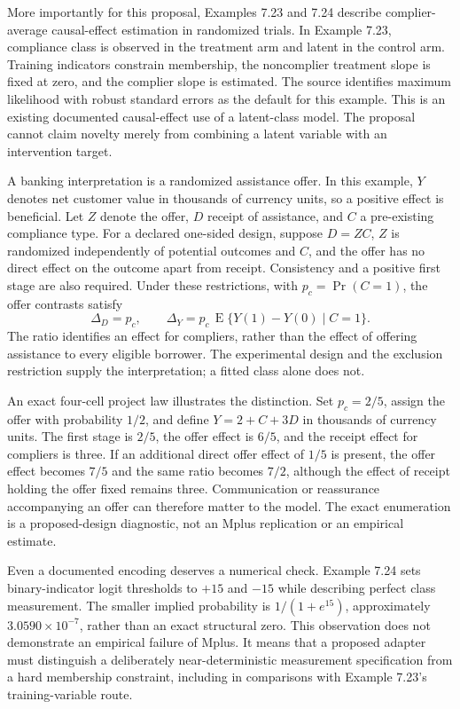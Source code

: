 More importantly for this proposal, Examples 7.23 and 7.24 describe
complier-average causal-effect estimation in randomized trials. In
Example 7.23, compliance class is observed in the treatment arm and
latent in the control arm. Training indicators constrain membership, the
noncomplier treatment slope is fixed at zero, and the complier slope is
estimated. The source identifies maximum likelihood with robust standard
errors as the default for this example. This is an existing documented
causal-effect use of a latent-class model. The proposal cannot claim
novelty merely from combining a latent variable with an intervention
target. \citep[pp.203--205]{exec13_latent_mplus}

A banking interpretation is a randomized assistance offer. In this
example, \(Y\) denotes net customer value in thousands of currency
units, so a positive effect is beneficial. Let \(Z\) denote the offer,
\(D\) receipt of assistance, and \(C\) a pre-existing compliance type.
For a declared one-sided design, suppose \(D=ZC\), \(Z\) is randomized
independently of potential outcomes and \(C\), and the offer has no
direct effect on the outcome apart from receipt. Consistency and a
positive first stage are also required. Under these restrictions, with
\(p_c=\Pr(C=1)\), the offer contrasts satisfy \[
 \Delta_D=p_c,\qquad
 \Delta_Y=p_c\,\operatorname{E}\{Y(1)-Y(0)\mid C=1\}.
\] The ratio identifies an effect for compliers, rather than the effect
of offering assistance to every eligible borrower. The experimental
design and the exclusion restriction supply the interpretation; a fitted
class alone does not.

An exact four-cell project law illustrates the distinction. Set
\(p_c=2/5\), assign the offer with probability \(1/2\), and define
\(Y=2+C+3D\) in thousands of currency units. The first stage is \(2/5\),
the offer effect is \(6/5\), and the receipt effect for compliers is
three. If an additional direct offer effect of \(1/5\) is present, the
offer effect becomes \(7/5\) and the same ratio becomes \(7/2\),
although the effect of receipt holding the offer fixed remains three.
Communication or reassurance accompanying an offer can therefore matter
to the model. The exact enumeration is a proposed-design diagnostic, not
an Mplus replication or an empirical estimate.
\citep{exec13_latent_examples}

Even a documented encoding deserves a numerical check. Example 7.24 sets
binary-indicator logit thresholds to \(+15\) and \(-15\) while
describing perfect class measurement. The smaller implied probability is
\(1/(1+e^{15})\), approximately \(3.0590\times10^{-7}\), rather than an
exact structural zero. This observation does not demonstrate an
empirical failure of Mplus. It means that a proposed adapter must
distinguish a deliberately near-deterministic measurement specification
from a hard membership constraint, including in comparisons with Example
7.23's training-variable route. \citep[pp.205--207]{exec13_latent_mplus,
exec13_latent_examples}

